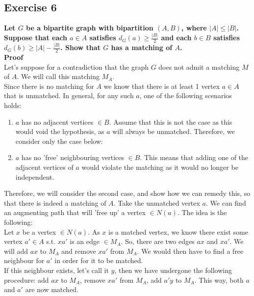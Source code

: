 \subsection*{Exercise 6}
\boldmath
\textbf{Let $G$ be a bipartite graph with bipartition $(A, B)$, where $|A| \leq |B|$. Suppose that each $a \in A$ satisfies $d_G(a) \geq \frac{|B|}{2}$ and each $b \in B$ satisfies $d_G(b) \geq |A|- \frac{|B|}{2}$. Show that $G$ has a matching of $A$.}
\unboldmath\\
\linebreak
\textbf{Proof}\\
Let's suppose for a contradiction that the graph $G$ does not admit a matching $M$ of $A$. We will call this matching $M_A$. \\
\linebreak 
Since there is no matching for $A$ we know that there is at least 1 vertex $a \in A$ that is unmatched. In general, for any such $a$, one of the following scenarios holds:
\begin{enumerate}
    \item $a$ has no adjacent vertices $\in B$. Assume that this is not the case as this would void the hypothesis, as $a$ will always be unmatched. Therefore, we consider only the case below:
    \item $a$ has no 'free' neighbouring vertices $\in B$. This means that adding one of the adjacent vertices of $a$ would violate the matching as it would no longer be independent. 
\end{enumerate}
Therefore, we will consider the second case, and show how we can remedy this, so that there is indeed a matching of $A$. Take the unmatched vertex $a$. We can find an augmenting path that will 'free up' a vertex $\in N(a)$. The idea is the following: \\
\linebreak 
Let $x$ be a vertex $\in N(a)$. As $x$ is a matched vertex, we know there exist some vertex $a' \in A$ s.t. $xa'$ is an edge $\in M_A$. So, there are two edges $ax$ and $xa'$. We will add $ax$ to $M_A$ and remove $xa'$ from $M_A$. We would then have to find a free neighbour for $a'$ in order for it to be matched. \\
\linebreak 
If this neighbour exists, let's call it $y$, then we have undergone the following procedure: add $ax$ to $M_A$, remove $xa'$ from $M_A$, add $a'y$ to $M_A$. This way, both $a$ and $a'$ are now matched.\\
\linebreak 
